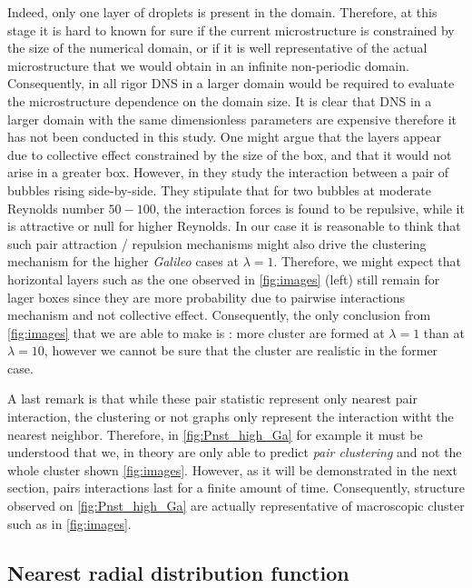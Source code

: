 Indeed, only one layer of droplets is present in the domain. 
Therefore, at this stage it is hard to known for sure if the current microstructure is constrained by the size of the numerical domain, or if it is well representative of the actual microstructure that we would obtain in an infinite non-periodic domain. 
Consequently, in all rigor DNS in a larger domain would be required to evaluate the microstructure dependence on the domain size. 
It is clear that DNS in a larger domain with the same dimensionless parameters are expensive therefore it has not been conducted in this study. 
One might argue that the layers appear due to collective effect constrained by the size of the box, and that it would not arise in a greater box. 
However, in \citet{legendre2003hydrodynamic} they study the interaction between a pair of bubbles rising side-by-side. 
They stipulate that for two bubbles at moderate Reynolds number $50-100$, the interaction forces is found to be repulsive, while it is attractive or null for higher Reynolds. 
In our case it is reasonable to think that such pair attraction / repulsion mechanisms might also drive the clustering mechanism for the higher \textit{Galileo} cases at $\lambda = 1$.
Therefore, we might expect that horizontal layers such as the one observed in \ref{fig:images} (left) still remain for lager boxes since they are more probability due to pairwise interactions mechanism and not collective effect. 
Consequently, the only conclusion from  \ref{fig:images} that we are able to make is : more cluster are formed at $\lambda =1$ than at $\lambda = 10$, however we cannot be sure that the cluster are realistic in the former case. 

A last remark is that while these pair statistic represent only nearest pair interaction, the clustering or not graphs only represent the interaction witht the nearest neighbor. 
Therefore, in \ref{fig:Pnst_high_Ga} for example it must be understood that we, in theory are only able to predict \textit{pair clustering} and not the whole cluster shown \ref{fig:images}.
However, as it will be demonstrated in the next section, pairs interactions last for a finite amount of time. 
Consequently, structure observed on \ref{fig:Pnst_high_Ga} are actually representative of macroscopic cluster such as in \ref{fig:images}. 


\subsection{Nearest radial distribution function }

